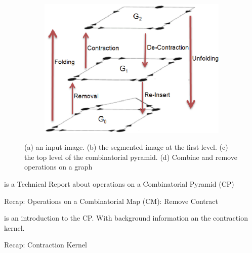 \documentclass[12pt]{article}
\begin{document}
\begin{figure}[tb]
    \begin{subfigure}[b]{0.4\textwidth}
        \includegraphics[width=\textwidth]{img/combine_remove.jpg}
        \caption{}\label{fig:combine_remove}
    \end{subfigure}

  \caption{(a) an input image. (b) the segmented image at the first level. (c) the top level of the combinatorial pyramid. (d) Combine and remove operations on a graph}\label{fig:prip}
\end{figure}

\cite{torrescanonical} is a Technical Report about operations
on a Combinatorial Pyramid (CP)

Recap: Operations on a Combinatorial Map (CM):
Remove
Contract

\cite{brun2001introduction} is an introduction to the CP. With
background information an the contraction
kernel.

Recap: Contraction Kernel
\end{document}
